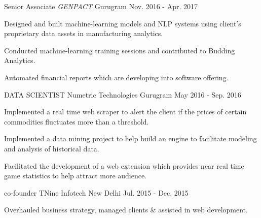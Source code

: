 

\begin{cventries}

  \cventry
    {Senior Associate} %
    {\emph{GENPACT}} %
    {Gurugram} %
    {Nov. 2016 - Apr. 2017} %
    {
      \begin{cvitems} %
        \item {Designed and built machine-learning models and NLP systems using client's proprietary data assets in manufacturing analytics.}
        \item {Conducted machine-learning training sessions and contributed to Budding Analytics.}
        \item {Automated financial reports which are developing into software offering.}
      \end{cvitems}
    }

  \cventry
    {DATA SCIENTIST} %
    {Numetric Technologies} %
    {Gurugram} %
    {May 2016 - Sep. 2016} %
    {
      \begin{cvitems} %
        \item {Implemented a real time web scraper to alert the client if the prices of certain commodities fluctuates more than a threshold.}
        \item {Implemented a data mining project to help build an engine to facilitate modeling and analysis of historical data.}
        \item {Facilitated the development of a web extension which provides near real time game statistics to help attract more audience.}
      \end{cvitems}
    }
  \cventry
	{co-founder}
	{TNine Infotech}
	{New Delhi}
	{Jul. 2015 - Dec. 2015}
	{
		\begin{cvitems}
			\item {Overhauled business strategy, managed clients \& assisted in web development.}
		\end{cvitems}
	}


\end{cventries}
